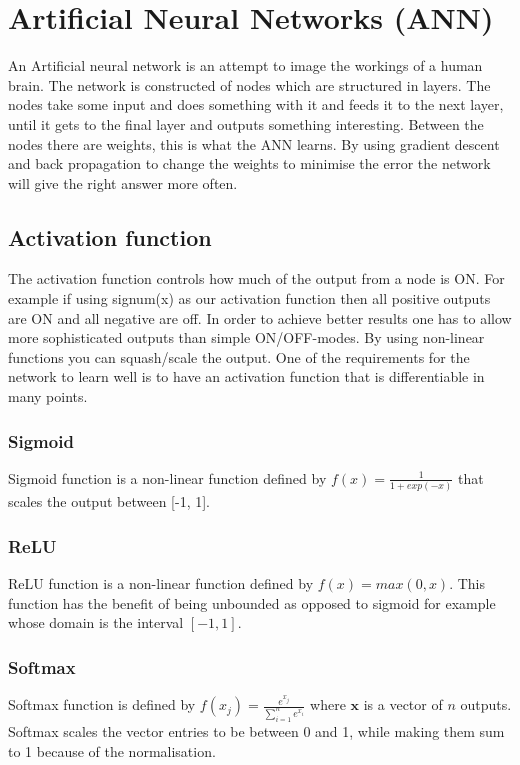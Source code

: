 \section{Artificial Neural Networks (ANN)}
An Artificial neural network is an attempt to image the workings of a human brain. The network is constructed of nodes which are structured in layers. The nodes take some input and does something with it and feeds it to the next layer, until it gets to the final layer and outputs something interesting. Between the nodes there are weights, this is what the ANN learns. By using gradient descent and back propagation to change the weights to minimise the error the network will give the right answer more often. 

\subsection{Activation function}
The activation function controls how much of the output from a node is ON. For example if using signum(x) as our activation function then all positive outputs are ON and all negative are off. In order to achieve better results one has to allow more sophisticated outputs than simple ON/OFF-modes. By using non-linear functions you can squash/scale the output. One of the requirements for the network to learn well is to have an activation function that is differentiable in many points.
\subsubsection{Sigmoid} %
Sigmoid function is a non-linear function defined by $f(x)=\frac{1}{1+exp(-x)}$ that scales the output between [-1, 1]. 
\subsubsection{ReLU}
ReLU function is a non-linear function defined by $f(x) = max(0,x)$. This function has the benefit of being unbounded as opposed to sigmoid for example whose domain is the interval $[-1, 1]$.  
\subsubsection{Softmax}
Softmax function is defined by $f(x_j) = \frac{e^{x_j}}{\sum_{i=1}^{n} e^{x_i}} $ where $\mathbf{x}$ is a vector of $n$ outputs. Softmax scales the vector entries to be between 0 and 1, while making them sum to 1 because of the normalisation.

